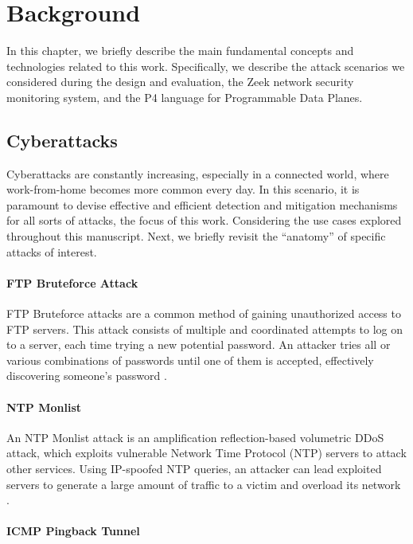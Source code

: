 \chapter{Background}
\label{cap:background}

In this chapter, we briefly describe the main fundamental concepts and technologies related to this work. Specifically, we describe the attack scenarios we considered during the design and evaluation, the Zeek network security monitoring system, and the P4 language for Programmable Data Planes.

\section{Cyberattacks}

Cyberattacks are constantly increasing, especially in a connected world, where work-from-home becomes more common every day. In this scenario, it is paramount to devise effective and efficient detection and mitigation mechanisms for all sorts of attacks, the focus of this work. Considering the use cases explored throughout this manuscript. Next, we briefly revisit the ``anatomy'' of specific attacks of interest.

\subsubsection*{FTP Bruteforce Attack}
\label{sec:bg:ftp_bruteforce}

FTP Bruteforce attacks are a common method of gaining unauthorized access to FTP servers. This attack consists of multiple and coordinated attempts to log on to a server, each time trying a new potential password. An attacker tries all or various combinations of passwords until one of them is accepted, effectively discovering someone's password \cite{FtpBruteforceAttack}.

\subsubsection*{NTP Monlist}
\label{sec:bg:ntp_monlist}

An NTP Monlist attack is an amplification reflection-based volumetric DDoS attack, which exploits vulnerable Network Time Protocol (NTP) servers to attack other services. Using IP-spoofed NTP queries, an attacker can lead exploited servers to generate a large amount of traffic to a victim and overload its network \cite{NtpMonlistAttack}.

\subsubsection*{ICMP Pingback Tunnel}
\label{sec:bg:pingback}

